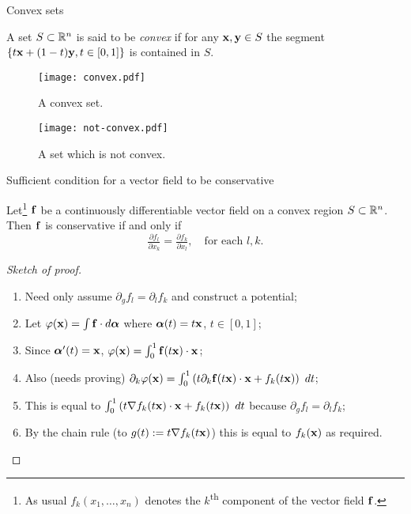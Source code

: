 {Convex sets}


\begin{definition}
    A set \(S\subset \mathbb{R}^n\) is said to be \emph{convex} if for any \(\mathbf{x},\mathbf{y}\in S\) the segment \(\{t\mathbf{x} + (1-t)\mathbf{y}, t\in[0,1]\}\) is contained in \(S\).
\end{definition}



\begin{figure}
    \centering
    \texttt{[image: convex.pdf]}
    \caption{A convex set.}
\end{figure}


\begin{figure}
    \centering
    \texttt{[image: not-convex.pdf]}
    \caption{A set which is not convex.}
\end{figure}

{Sufficient condition for a vector field to be conservative}


\begin{theorem}
    Let\footnote{As usual  \(  f_k(x_1,\ldots,x_n)\) denotes the \(k\)\textsuperscript{th} component of the vector field \(\mathbf{f}\).} \(\mathbf{f}\) be a continuously differentiable vector field on a convex region \(S\subset \mathbb{R}^n\).
    Then \(\mathbf{f}\) is conservative if and only if
    \[
        \tfrac{\partial f_l}{\partial x_k} = \tfrac{\partial f_k}{\partial x_l},
        \quad \text{for each \(l,k\)}.
    \]
\end{theorem}



\begin{proof}[Sketch of proof]
    \begin{enumerate}
        \item Need only assume \(\partial_g f_l = \partial_l f_k\) and construct a potential;
        \item Let \(\varphi(\mathbf{x}) = \int \mathbf{f} \cdot d\boldsymbol{\alpha}\) where \(\boldsymbol{\alpha}(t) = t\mathbf{x}\), \(t\in[0,1]\);
        \item Since \(\boldsymbol{\alpha}'(t) = \mathbf{x}\), \(\varphi(\mathbf{x}) = \int_0^1 \mathbf{f}(t\mathbf{x})\cdot \mathbf{x}\);
        \item Also (needs proving) \(\partial_k  \varphi(\xx) = \int_{0}^{1} \left( t \partial_k \ff(t\xx) \cdot \xx + f_k(t\xx) \right) \ dt\);
        \item This is equal to \(\int_{0}^{1} \left( t \nabla f_k(t\mathbf{x}) \cdot \mathbf{x} + f_k(t\mathbf{x}) \right) \ dt\) because  \(\partial_g f_l = \partial_l f_k\);
        \item By the chain rule (to \(g(t):= t \nabla f_k(t\mathbf{x}) \)) this is equal to \(f_k(\mathbf{x})\) as required.
    \end{enumerate}

\end{proof}




